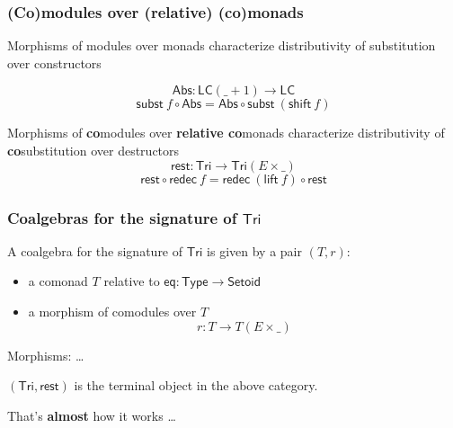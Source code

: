 \documentclass[
]
{beamer}
\newcommand{\constfont}[1]{\ensuremath{\mathsf{#1}}}
\newcommand{\bind}[2]{{#1}\mathbin{\gg\hspace{-.8ex}=}{#2}}
\newcommand{\Tri}{\constfont{Tri}}
\newcommand{\tail}{\constfont{rest}}
\newcommand{\redec}{\constfont{redec}}
\newcommand{\comp}[2]{\ensuremath{{#2} \circ {#1}}}
\newcommand{\shift}{\constfont{shift}}
\newcommand{\lift}{\constfont{lift}}
\newcommand{\subst}{\constfont{subst}}
\newcommand{\Setoid}{\constfont{Setoid}}
\newcommand{\eq}{\ensuremath{\mathsf{eq}}}
\newcommand{\App}{\constfont{App}}
\newcommand{\Abs}{\constfont{Abs}}
\newcommand{\LC}{\mathsf{LC}}
\newcommand{\Set}{\constfont{Type}}
\newcommand{\fat}[1]{\textbf{#1}}
\begin{document}
\begin{frame}
 \frametitle{(Co)modules over (relative) (co)monads}
 \begin{block}{Morphisms of modules over monads}
   characterize distributivity of substitution over constructors

         \[ \Abs : \LC(\_ + 1) \to \LC \]
         \[ \comp{\Abs}{\subst~f} = \comp{\subst~(\shift~f)}{\Abs} \]
 \end{block}

 \begin{block}{Morphisms of \fat{co}modules over \fat{relative co}monads}
   characterize distributivity of \fat{co}substitution over destructors
         \[\tail : \Tri \to \Tri(E\times \_)\]
         \[\comp{\redec~f}{\tail} = \comp{\tail}{\redec~(\lift~f)} \]
 \end{block} 
\end{frame}

\begin{frame}
 \frametitle{Coalgebras for the signature of $\Tri$}
  \begin{definition}
    A coalgebra for the signature of $\Tri$ is given by a pair $(T,r)$:
    \begin{itemize}
     \item a comonad $T$ relative to $\eq: \Set \to \Setoid$
     \item a morphism of comodules over $T$
        \[  r : T \to T(E \times \_) \]
    \end{itemize}
   Morphisms: \ldots
  \end{definition}

 \begin{lemma}
  $(\Tri,\tail)$ is the terminal object in the above category.
 \end{lemma}

 That's \fat{almost} how it works \ldots
  
\end{frame}
\end{document}
